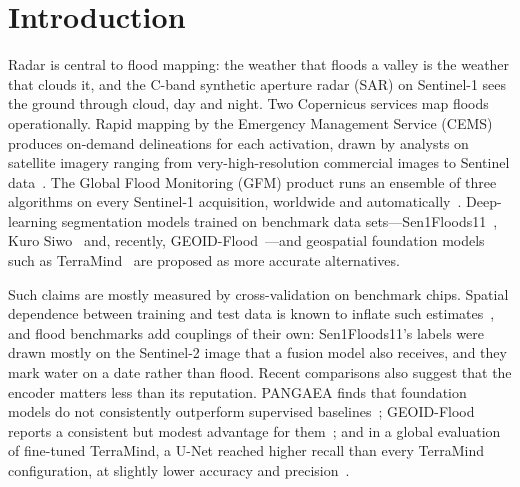 \documentclass[10pt,twocolumn,a4paper]{article}
\begin{document}
\section{Introduction}

Radar is central to flood mapping: the weather that floods a valley is the weather that clouds it, and the C-band synthetic aperture radar (SAR) on Sentinel-1 sees the ground through cloud, day and night.
Two Copernicus services map floods operationally. Rapid mapping by the Emergency Management Service (CEMS) produces
on-demand delineations for each activation, drawn by analysts on satellite imagery ranging from very-high-resolution
commercial images to Sentinel data~\citep{cems2026rapidmapping}. The Global Flood Monitoring (GFM) product runs an ensemble of three algorithms
on every Sentinel-1 acquisition, worldwide and automatically~\citep{salamon2021gfm,krullikowski2023gfm}.
Deep-learning segmentation models trained on benchmark data sets---Sen1Floods11~\citep{bonafilia2020sen1floods11},
Kuro Siwo~\citep{bountos2024kurosiwo} and, recently, GEOID-Flood~\citep{chiriaco2026geoid}---and geospatial
foundation models such as TerraMind~\citep{jakubik2025terramind} are proposed as more accurate alternatives.

Such claims are mostly measured by cross-validation on benchmark chips. Spatial dependence between training and
test data is known to inflate such estimates~\citep{roberts2017cv,ploton2020spatial,meyer2022maps}, and flood
benchmarks add couplings of their own: Sen1Floods11's labels were drawn mostly on the Sentinel-2 image that a fusion
model also receives, and they mark water on a date rather than flood. Recent comparisons also suggest that the encoder
matters less than its reputation. PANGAEA finds that foundation models do not consistently outperform supervised
baselines~\citep{marsocci2024pangaea}; GEOID-Flood reports a consistent but modest advantage for
them~\citep{chiriaco2026geoid}; and in a global evaluation of fine-tuned TerraMind, a U-Net reached higher recall
than every TerraMind configuration, at slightly lower accuracy and precision~\citep{tulbure2025floodsnet}.
\end{document}
